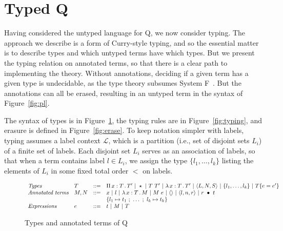\documentclass{article}
\begin{document}
\section{Typed Q}

Having considered the untyped language for Q, we now consider typing.  The approach we describe
is a form of Curry-style typing, and so the essential matter is to describe types and which
untyped terms have which types.  But we present the typing relation on annotated terms, so
that there is a clear path to implementing the theory.  Without annotations, deciding if a
given term has a given type is undecidable, as the type theory subsumes System F~\cite{wells99}.
But the annotations can all be erased, resulting in an untyped term in the syntax of Figure~\ref{fig:pl}.

The syntax of types is in Figure~\ref{fig:tp}, the typing rules are in Figure~\ref{fig:typing}, and erasure
is defined in Figure~\ref{fig:erase}.  To keep notation simpler with labels, typing assumes a label context
$\mathcal{L}$, which is a partition (i.e., set of disjoint sets $L_i$) of a finite set of labels.  Each disjoint
set $L_i$ serves as an association of labels, so that when a term contains label $l \in L_i$, we assign
the type $\{l_1,\ldots,l_k\}$ listing the elements of $L_i$ in some fixed total order $<$ on labels.

\begin{figure}
  \[
  \begin{array}{llll}
    \textit{Types} & T & ::= & \Pia{x}{T}{T'}\ |\ \star\ |\ T\ T'\ |\ \tlam{x}{T}{T'}\ |\ \w{L}{N}{S}\ |\ \{ l_1 , \ldots , l_k \}\
    |\ \eqtm{e}{T}{e'} \\
    \textit{Annotated terms} & M, N & ::= & x\ |\ l\ |\ \tlam{x}{T}{M}\ |\ M\ e\ |\ \wunit\ |\ \ctor{l}{n}{r}\ |\ \wrec{r}{t} \\
    \ &\ &\ & \{ l_1 \mapsto t_1\ ;\ \ldots\ ;\ l_k\mapsto t_k \} \\

    \textit{Expressions} & e & ::= & t\ |\ M\ |\ T
  \end{array}
  \]
\caption{Types and annotated terms of Q}
\label{fig:tp}
\end{figure}




\end{document}
